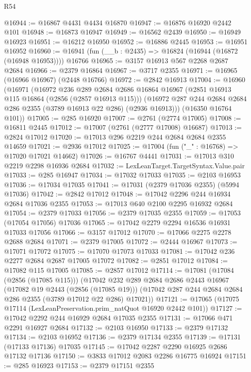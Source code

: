 \begin{lexlean}{R54}
\begin{coremodule}
@16944 := @16867 @4431 @4434 @16870
@16947 := @16876 @16920 @2442 @101
@16948 := @16873 @16947
@16949 := @16562 @2439
@16950 := @16949 @16923
@16951 := @16212 @16950
@16952 := @16886 @2445
@16953 := @16951 @16952
@16960 := @16941 (fun (__b : @2435) => @16824 (@16944 (@16872 (@16948 @16953)))) @16766
@16965 := @3157 @16913 @567 @2268 @2687 @2684
@16966 := @2379 @16864
@16967 := @3717 @2355
@16971 := @16965 (@16966 @16967) (@2448 @16766)
@16972 := @2842 @16913
@17004 := @16960
    (@16971
      (@16972
        @236
        @289
        @2684
        @2686
        @16864
        @16967
        (@2851 @16913 @115 @16864 (@2856 (@2857 @16913 @115)))
        (@16972 @287 @244 @2684 @2684 @286 @2355 (@3789 @16913 @22 @286) (@2936 @16913)))
      (@16350 @16764 @101))
@17005 := @285 @16920
@17007 := @2761 (@2774 @17005)
@17008 := @16811 @2445
@17012 := @17007 (@2761 (@2777 @17008) @16687)
@17013 := @2824 @17012
@17020 := @17013 @296 @2219 @244 @2684 @2684 @2355 @14659
@17021 := @2936 @17012
@17025 := @17004 (fun ("_" : @16768) => @17020 @17021 @14662)
@17026 := @16767 @4441
@17031 := @17013 @310 @2219 @2298 @16936 @2684
@17032 := LexLeanTarget.TargetSyntax.Value.pair
@17033 := @285 @16947
@17034 := @17032 @17033
@17035 := @2103 @16953
@17036 := @17034 @17035
@17041 := @17031 (@2379 @17036 @2355) (@5994 @17036)
@17042 := @2842 @17012
@17048 := @17042 @2296 @244 @16934 @2684 @17036 @2355
@17053 := @17013 @640 @2100 @2295 @16932 @2684
@17054 := @2379 @17033
@17056 := @2379 @17035 @2355
@17059 := @17053 (@17054 @17056) @17036
@17065 := @17042 @2279 @2294 @16536 @16931 @17033 @17056
@17066 := @3157 @17012
@17070 := @17066 @2275 @2278 @2688 @2684
@17071 := @2379 @17005
@17072 := @2444 @16967
@17073 := @17071 @17072
@17075 := @17070 @17073 @17033
@17081 := @17042 @236 @2277 @2684 @2687 @17005 @17072
@17082 := @2851 @17012
@17084 := @17082 @115 @17005
@17085 := @2857 @17012
@17114 := @17081
    (@17084 (@2856 (@17085 @115)))
    (@17042
      @232
      @289
      @2684
      @2686
      @2443
      @16967
      (@17082 @19 @2443 (@2856 (@17085 @19)))
      (@17042 @287 @244 @2684 @2684 @286 @2355 (@3789 @17012 @22 @286) @17021))
@17121 := @17065 (@17075 @17114 (LexLeanPreservation.prim_natQuot @16920 @2442 @101))
@17127 := @17042 @2292 @244 @16929 @2684 @17035 @2355
@17131 := @17066 @471 @2291 @16927 @2684
@17132 := @2103 @16950
@17133 := @2379 @17132
@17134 := @2103 @16952
@17136 := @2379 @17134 @2355
@17139 := @17131 (@17133 @17136) @17035
@17145 := @17042 @2287 @2290 @16925 @2686 @17132 @17136
@17150 := @3833 @17012 @2083 @2286 @16775 @16924
@17151 := @285 @16923
@17153 := @2379 @17151 @2355

\end{coremodule}
\end{lexlean}
